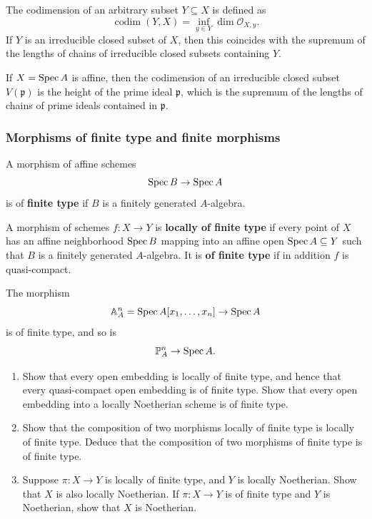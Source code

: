 \documentclass[12pt]{article}
\begin{document}
\begin{definition}
    The codimension of an arbitrary subset \(Y\subseteq X\) is defined as \[\operatorname{codim}(Y,X) = \inf_{y\in Y} \dim \mathcal O_{X,y}.\] If $Y$ is an irreducible closed subset of \(X\), then this coincides with the supremum of the lengths of chains of irreducible closed subsets containing \(Y\).
\end{definition}

If $X = \operatorname{Spec} A$ is affine, then the codimension of an irreducible closed subset $V(\mathfrak p)$ is the height of the prime ideal $\mathfrak p$, which is the supremum of the lengths of chains of prime ideals contained in $\mathfrak p$.

\subsubsection{Morphisms of finite type and finite morphisms}

\begin{definition}
    A morphism of affine schemes
    \[
        \operatorname{Spec} B \to \operatorname{Spec} A
    \]
    is of \textbf{finite type} if $B$ is a finitely generated $A$-algebra.
\end{definition}

\begin{definition}
    A morphism of schemes $f:X\to Y$ is \textbf{locally of finite type} if every point of $X$ has an affine neighborhood $\operatorname{Spec} B$ mapping into an affine open $\operatorname{Spec} A\subseteq Y$ such that $B$ is a finitely generated $A$-algebra. It is \textbf{of finite type} if in addition $f$ is quasi-compact.
\end{definition}

\begin{example}
    The morphism
    \[
        \mathbb A^n_A=\operatorname{Spec} A[x_1,\dots,x_n]\to \operatorname{Spec} A
    \]
    is of finite type, and so is
    \[
        \mathbb P^n_A\to \operatorname{Spec} A.
    \]
\end{example}

\begin{exercise}
    \leavevmode
    \begin{enumerate}
        \item[(a)] Show that every open embedding is locally of finite type, and hence that every quasi-compact open embedding is of finite type. Show that every open embedding into a locally Noetherian scheme is of finite type.

        \item[(b)] Show that the composition of two morphisms locally of finite type is locally of finite type. Deduce that the composition of two morphisms of finite type is of finite type.

        \item[(c)] Suppose $\pi : X \to Y$ is locally of finite type, and $Y$ is locally Noetherian. Show that $X$ is also locally Noetherian. If $\pi : X \to Y$ is of finite type and $Y$ is Noetherian, show that $X$ is Noetherian.
    \end{enumerate}
\end{exercise}
\end{document}
